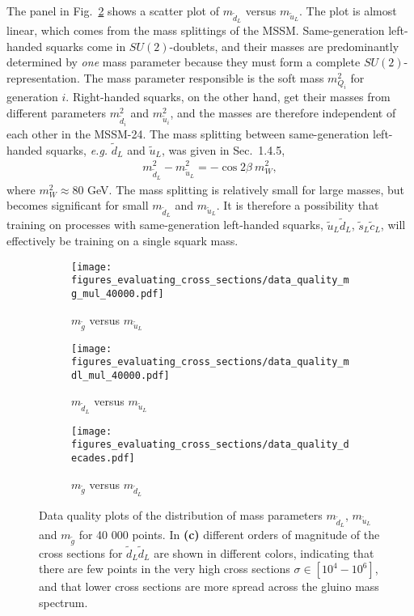 \documentclass[twoside,english]{uiofysmaster}
\begin{document}
{The panel in Fig.~\ref{Fig:: evaluating cross : Data quality dlul} shows a scatter plot of $m_{\widetilde{d}_L}$ versus $m_{\widetilde{u}_L}$. The plot is almost linear, which comes from the mass splittings of the MSSM. Same-generation left-handed squarks come in $SU(2)$-doublets, and their masses are predominantly determined by \textit{one} mass parameter because they must form a complete $SU(2)$-representation. The mass parameter responsible is the soft mass $m_{Q_i}^2$ for generation $i$.  Right-handed squarks, on the other hand, get their masses from different parameters $m_{\widetilde{d}_i}^2$ and $m_{\widetilde{u}_i}^2$, and the masses are therefore independent of each other in the MSSM-24. The mass splitting between same-generation left-handed squarks, \textit{e.g.} $\widetilde{d}_L$ and $\widetilde{u}_L$, was given in Sec.~1.4.5,
\begin{align*}
m_{\widetilde{d}_L}^2 - m_{\widetilde{u}_L}^2 = - \cos 2 \beta ~m_W^2,
\end{align*}
where $m_W^2 \approx 80$ GeV. The mass splitting is relatively small for large masses, but becomes significant for small $m_{\widetilde{d}_L}$ and $m_{\widetilde{u}_L}$. It is therefore a possibility that training on processes with same-generation left-handed squarks, $\widetilde{u}_L \widetilde{d}_L$, $\widetilde{s}_L \widetilde{c}_L$, will effectively be training on a single squark mass. 

\begin{figure}
    \centering
    \begin{subfigure}[b]{0.65\textwidth}
        \texttt{[image: figures\_evaluating\_cross\_sections/data\_quality\_mg\_mul\_40000.pdf]}
        \caption{$m_{\widetilde{g}}$ versus $m_{\widetilde{u}_L}$}
        \label{Fig:: evaluating cross : Data quality mgul}
    \end{subfigure}
    \begin{subfigure}[b]{0.65\textwidth}
        \texttt{[image: figures\_evaluating\_cross\_sections/data\_quality\_mdl\_mul\_40000.pdf]}
        \caption{$m_{\widetilde{d}_L}$ versus $m_{\widetilde{u}_L}$}
        \label{Fig:: evaluating cross : Data quality dlul}
    \end{subfigure}
    \begin{subfigure}[b]{0.85\textwidth}
        \centering
        \texttt{[image: figures\_evaluating\_cross\_sections/data\_quality\_decades.pdf]}
        \caption{$m_{\widetilde{g}}$ versus $m_{\widetilde{d}_L}$}
        \label{Fig:: evaluating cross : Data quality mgdl decades}
    \end{subfigure}
    \caption{Data quality plots of the distribution of mass parameters $m_{\widetilde{d}_L}$, $m_{\widetilde{u}_L}$ and $m_{\widetilde{g}}$ for 40 000 points. In \textbf{(c)} different orders of magnitude of the cross sections for $\widetilde{d}_L \widetilde{d}_L$ are shown in different colors, indicating that there are few points in the very high cross sections $\sigma \in [10^{4}-10^{6}]$, and that lower cross sections are more spread across the gluino mass spectrum. }
    \label{Fig:: evaluating cross : Data quality}
\end{figure}

}
\end{document}
